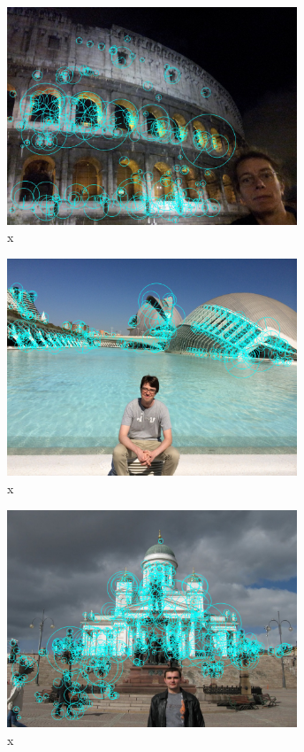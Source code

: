 \documentclass[runningheads]{llncs}
\begin{document}
\begin{figure} \centering \includegraphics[height=6.5cm]{images/tanner.jpg}
\caption{x} \label{fig:example} \end{figure}

\begin{figure} \centering \includegraphics[height=6.5cm]{images/till2.jpg}
\caption{x} \label{fig:example} \end{figure}

\begin{figure} \centering \includegraphics[height=6.5cm]{images/timofte.jpg}
\caption{x} \label{fig:example} \end{figure}
\end{document}

